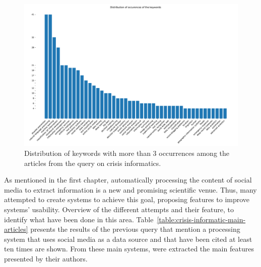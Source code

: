 \begin{figure}[htb]
    \includegraphics[width=\textwidth]{figures/chap-2/crisis-informatic-bar.pdf}
    \caption{Distribution of keywords with more than 3 occurrences among the articles from the query on crisis informatics. }
    \label{literature:crisis-informatic-bar}
\end{figure}

As mentioned in the first chapter, automatically processing the content of social media to extract information is a new and promising scientific venue.
Thus, many attempted to create systems to achieve this goal, proposing features to improve systems' usability.
Overview of the different attempts and their feature, to identify what have been done in this area.
Table~\ref{table:crisis-informatic-main-articles} presents the results of the previous query that mention a processing system that uses social media as a data source and that have been cited at least ten times are shown.
From these main systems, were extracted the main features presented by their authors.

